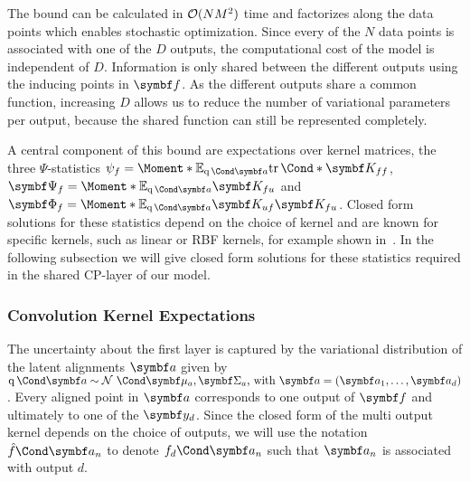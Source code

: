 The bound can be calculated in $\operatorname{\mathcal{O}}(NM^2)$ time and factorizes along the data points which enables stochastic optimization.
Since every of the $N$ data points is associated with one of the $D$ outputs, the computational cost of the model is independent of $D$.
Information is only shared between the different outputs using the inducing points in $\mat{f}$.
As the different outputs share a common function, increasing $D$ allows us to reduce the number of variational parameters per output, because the shared function can still be represented completely.

A central component of this bound are expectations over kernel matrices, the three $\Psi$-statistics $\psi_f = \Moment*{\E_{\Variat{\rv{a}}}}{\Fun*{\tr}{\mat{K_{ff}}}}$, $\mat{\Psi_f} = \Moment*{\E_{\Variat{\rv{a}}}}{\mat{K_{fu}}}$ and $\mat{\Phi_f} = \Moment*{\E_{\Variat{\rv{a}}}}{\mat{K_{uf}}\mat{K_{fu}}}$.
Closed form solutions for these statistics depend on the choice of kernel and are known for specific kernels, such as linear or RBF kernels, for example shown in~\parencite{damianou_deep_2013}.
In the following subsection we will give closed form solutions for these statistics required in the shared CP-layer of our model.

\subsubsection{Convolution Kernel Expectations}
The uncertainty about the first layer is captured by the variational distribution of the latent alignments $\rv{a}$ given by $\Variat{\rv{a}} \sim \Gaussian{\mat{\mu}_a, \mat{\Sigma}_a}\text{, with } \rv{a} = \left( \rv{a}_1, \dots, \rv{a}_d \right)$.
Every aligned point in $\rv{a}$ corresponds to one output of $\rv{f}$ and ultimately to one of the $\rv{y}_d$.
Since the closed form of the multi output kernel depends on the choice of outputs, we will use the notation $\Fun{\hat{f}}{\rv{a}_n}$ to denote $\Fun{f_d}{\rv{a}_n}$ such that $\rv{a}_n$ is associated with output $d$.


